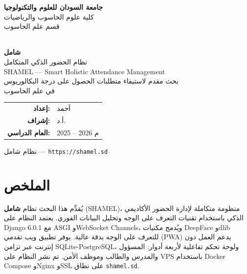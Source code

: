 \documentclass[12pt, a4paper]{report}
\begin{document}

\begin{titlepage}
\centering
\vspace*{0.8cm}
{\large\bfseries جامعة السودان للعلوم والتكنولوجيا}\\[0.2cm]
{\large كلية علوم الحاسوب والرياضيات}\\[0.2cm]
{\large قسم علم الحاسوب}\\[1.5cm]

\\[1.2cm]

{\fontsize{28}{34}\selectfont\bfseries\color{shamelnavy} شامل}\\[0.3cm]
{\Large\color{shamelgold} نظام الحضور الذكي المتكامل}\\[0.2cm]
{\large\color{gray} SHAMEL — Smart Holistic Attendance Management}\\[1.5cm]

{\large بحث مقدم لاستيفاء متطلبات الحصول على درجة البكالوريوس}\\[0.2cm]
{\large في علم الحاسوب}\\[1.5cm]

\begin{tabular}{rl}
  \textbf{إعداد:} & أحمد \\[0.3cm]
  \textbf{إشراف:} & أ.د. \\[0.3cm]
  \textbf{العام الدراسي:} & 2025 -- 2026 م
\end{tabular}
\vfill
{\small\color{gray} نظام شامل — \texttt{https://shamel.sd}}
\end{titlepage}


\chapter*{الملخص}
يُقدِّم هذا البحث نظام \textbf{شامل} (SHAMEL)، منظومة متكاملة لإدارة الحضور الأكاديمي الذكي باستخدام تقنيات التعرف على الوجه وتحليل البيانات الفوري. يعتمد النظام على Django 6.0.1 مع ASGI وWebSocket Channels، ويُدمج مكتبات DeepFace وdlib للتعرف على الوجه بدقة عالية. يوفر تطبيق ويب تقدمي (PWA) يدعم العمل دون إنترنت عبر تزامن SQLite-PostgreSQL، ولوحة تحكم تفاعلية لأربعة أدوار: المسؤول والمدرس والطالب وموظف الأمن. تم نشر النظام على VPS باستخدام Docker Compose وNginx وSSL على نطاق \texttt{shamel.sd}.
\end{document}

